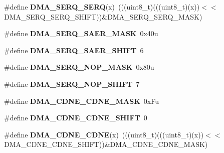 \begin{DoxyCompactItemize}
\item 
\#define {\bfseries D\+M\+A\+\_\+\+S\+E\+R\+Q\+\_\+\+S\+E\+RQ}(x)~(((uint8\+\_\+t)(((uint8\+\_\+t)(x))$<$$<$D\+M\+A\+\_\+\+S\+E\+R\+Q\+\_\+\+S\+E\+R\+Q\+\_\+\+S\+H\+I\+FT))\&D\+M\+A\+\_\+\+S\+E\+R\+Q\+\_\+\+S\+E\+R\+Q\+\_\+\+M\+A\+SK)\hypertarget{group__DMA__Register__Masks_ga0b5a7acb359bcc57dd725102edfd21f9}{}\label{group__DMA__Register__Masks_ga0b5a7acb359bcc57dd725102edfd21f9}

\item 
\#define {\bfseries D\+M\+A\+\_\+\+S\+E\+R\+Q\+\_\+\+S\+A\+E\+R\+\_\+\+M\+A\+SK}~0x40u\hypertarget{group__DMA__Register__Masks_gad102371be9a2c3a971988f98297f85eb}{}\label{group__DMA__Register__Masks_gad102371be9a2c3a971988f98297f85eb}

\item 
\#define {\bfseries D\+M\+A\+\_\+\+S\+E\+R\+Q\+\_\+\+S\+A\+E\+R\+\_\+\+S\+H\+I\+FT}~6\hypertarget{group__DMA__Register__Masks_ga47c6cd05ecac5d87cdd944a6a3630571}{}\label{group__DMA__Register__Masks_ga47c6cd05ecac5d87cdd944a6a3630571}

\item 
\#define {\bfseries D\+M\+A\+\_\+\+S\+E\+R\+Q\+\_\+\+N\+O\+P\+\_\+\+M\+A\+SK}~0x80u\hypertarget{group__DMA__Register__Masks_ga149895dd87ae0297478305fb26cc426e}{}\label{group__DMA__Register__Masks_ga149895dd87ae0297478305fb26cc426e}

\item 
\#define {\bfseries D\+M\+A\+\_\+\+S\+E\+R\+Q\+\_\+\+N\+O\+P\+\_\+\+S\+H\+I\+FT}~7\hypertarget{group__DMA__Register__Masks_ga2aef1400cca514fe504a0f23b53bea33}{}\label{group__DMA__Register__Masks_ga2aef1400cca514fe504a0f23b53bea33}

\item 
\#define {\bfseries D\+M\+A\+\_\+\+C\+D\+N\+E\+\_\+\+C\+D\+N\+E\+\_\+\+M\+A\+SK}~0x\+Fu\hypertarget{group__DMA__Register__Masks_ga42965bab0b0f5b27c28045c06f43d43d}{}\label{group__DMA__Register__Masks_ga42965bab0b0f5b27c28045c06f43d43d}

\item 
\#define {\bfseries D\+M\+A\+\_\+\+C\+D\+N\+E\+\_\+\+C\+D\+N\+E\+\_\+\+S\+H\+I\+FT}~0\hypertarget{group__DMA__Register__Masks_ga4993325bdeae286074e4e8eace0e19ef}{}\label{group__DMA__Register__Masks_ga4993325bdeae286074e4e8eace0e19ef}

\item 
\#define {\bfseries D\+M\+A\+\_\+\+C\+D\+N\+E\+\_\+\+C\+D\+NE}(x)~(((uint8\+\_\+t)(((uint8\+\_\+t)(x))$<$$<$D\+M\+A\+\_\+\+C\+D\+N\+E\+\_\+\+C\+D\+N\+E\+\_\+\+S\+H\+I\+FT))\&D\+M\+A\+\_\+\+C\+D\+N\+E\+\_\+\+C\+D\+N\+E\+\_\+\+M\+A\+SK)\hypertarget{group__DMA__Register__Masks_gaad52359ad6d26f38404b2fffde7f9305}{}\label{group__DMA__Register__Masks_gaad52359ad6d26f38404b2fffde7f9305}


\end{DoxyCompactItemize}
